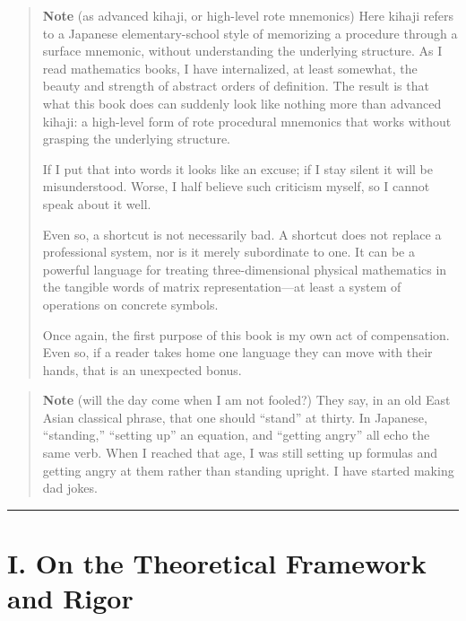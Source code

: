 \begin{quote}
\textbf{Note} (as advanced kihaji, or high-level rote mnemonics) Here
kihaji refers to a Japanese elementary-school style of memorizing a
procedure through a surface mnemonic, without understanding the
underlying structure. As I read mathematics books, I have internalized,
at least somewhat, the beauty and strength of abstract orders of
definition. The result is that what this book does can suddenly look
like nothing more than advanced kihaji: a high-level form of rote
procedural mnemonics that works without grasping the underlying
structure.

If I put that into words it looks like an excuse; if I stay silent it
will be misunderstood. Worse, I half believe such criticism myself, so I
cannot speak about it well.

Even so, a shortcut is not necessarily bad. A shortcut does not replace
a professional system, nor is it merely subordinate to one. It can be a
powerful language for treating three-dimensional physical mathematics in
the tangible words of matrix representation---at least a system of
operations on concrete symbols.

Once again, the first purpose of this book is my own act of
compensation. Even so, if a reader takes home one language they can move
with their hands, that is an unexpected bonus.
\end{quote}

\begin{quote}
\textbf{Note} (will the day come when I am not fooled?) They say, in an
old East Asian classical phrase, that one should ``stand'' at thirty. In
Japanese, ``standing,'' ``setting up'' an equation, and ``getting
angry'' all echo the same verb. When I reached that age, I was still
setting up formulas and getting angry at them rather than standing
upright. I have started making dad jokes.
\end{quote}

\begin{center}\rule{0.5\linewidth}{0.5pt}\end{center}

\hypertarget{i.-on-the-theoretical-framework-and-rigor}{%
\section{I. On the Theoretical Framework and
Rigor}\label{i.-on-the-theoretical-framework-and-rigor}}

